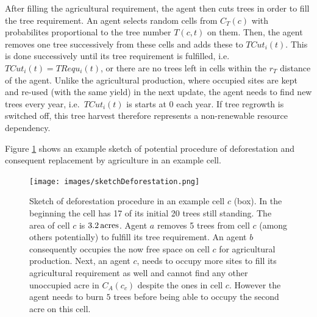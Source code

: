 After filling the agricultural requirement, the agent then cuts trees in order to fill the tree requirement. 
An agent selects random cells from $C_T(c)$ with probabilites proportional to the tree number $T(c,t)$ on them.
Then, the agent removes one tree successively from these cells and adds these to $TCut_i(t)$.
This is done successively until its tree requirement is fulfilled, i.e.\ $TCut_i(t)=TRequ_i(t)$, or there are no trees left in cells within the $r_T$ distance of the agent.
Unlike the agricultural production, where occupied sites are kept and re-used (with the same yield) in the next update, the agent needs to find new trees every year, i.e.\ $TCut_i(t)$ is starts at $0$ each year.
If tree regrowth is switched off, this tree harvest therefore represents a non-renewable resource dependency.

Figure \TODO \ref{fig:treeburning} shows an example sketch of potential procedure of deforestation and consequent replacement by agriculture in an example cell. 

\begin{figure}
	\centering
	\texttt{[image: images/sketchDeforestation.png]}
	\caption{Sketch of deforestation procedure in an example cell $c$ (box). 
		In the beginning the cell has 17 of its initial 20 trees still standing. 
		The area of cell $c$ is $3.2\, \rm{acres}$. 
		Agent $a$ removes 5 trees from cell $c$ (among others potentially) to fulfill its tree requirement. An agent $b$ consequently occupies the now free space on cell $c$ for agricultural production. 
		Next, an agent $c$, needs to occupy more sites to fill its agricultural requirement as well and cannot find any other unoccupied acre in $C_A(c_c)$ despite the ones in cell $c$. 
	However the agent needs to burn $5$ trees before being able to occupy the second acre on this cell.}
	\label{fig:treeburning}
\end{figure}


